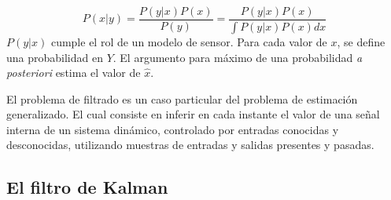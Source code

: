 \begin{equation}
	P(x|y)=\frac{P(y|x)P(x)}{P(y)}=\frac{P(y|x)P(x)}{\int{P(y|x)P(x)dx}}
\end{equation}
$P(y|x)$ cumple el rol de un modelo de sensor.
Para cada valor de $x$, se define una probabilidad en $Y$.
El argumento para máximo de una probabilidad \textit{a posteriori} estima el valor de $\hat{x}$.\par
El problema de filtrado es un caso particular del problema de estimación generalizado.
El cual consiste en inferir en cada instante el valor de una señal interna de un sistema dinámico, controlado por entradas conocidas y desconocidas,
utilizando muestras de entradas y salidas presentes y pasadas.


\subsection{El filtro de Kalman}
\label{subsec:kalmanfilter}

